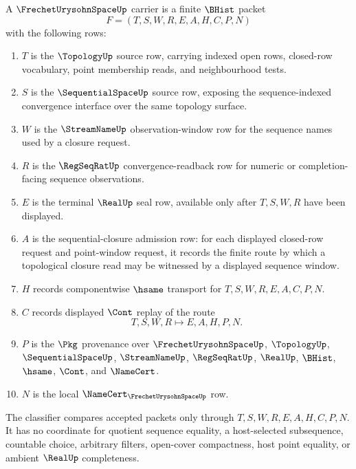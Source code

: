 \begin{definition}\label{def:frechet-urysohn-space-carrier}
A $\FrechetUrysohnSpaceUp$ carrier is a finite $\BHist$ packet
$$
F=(T,S,W,R,E,A,H,C,P,N)
$$
with the following rows:
\begin{enumerate}
\item $T$ is the $\TopologyUp$ source row, carrying indexed open rows, closed-row vocabulary, point membership reads, and neighbourhood tests.
\item $S$ is the $\SequentialSpaceUp$ source row, exposing the sequence-indexed convergence interface over the same topology surface.
\item $W$ is the $\StreamNameUp$ observation-window row for the sequence names used by a closure request.
\item $R$ is the $\RegSeqRatUp$ convergence-readback row for numeric or completion-facing sequence observations.
\item $E$ is the terminal $\RealUp$ seal row, available only after $T,S,W,R$ have been displayed.
\item $A$ is the sequential-closure admission row: for each displayed closed-row request and point-window request, it records the finite route by which a topological closure read may be witnessed by a displayed sequence window.
\item $H$ records componentwise $\hsame$ transport for $T,S,W,R,E,A,C,P,N$.
\item $C$ records displayed $\Cont$ replay of the route
$$
T,S,W,R \longmapsto E,A,H,P,N .
$$
\item $P$ is the $\Pkg$ provenance over $\FrechetUrysohnSpaceUp$, $\TopologyUp$, $\SequentialSpaceUp$, $\StreamNameUp$, $\RegSeqRatUp$, $\RealUp$, $\BHist$, $\hsame$, $\Cont$, and $\NameCert$.
\item $N$ is the local $\NameCert_{\FrechetUrysohnSpaceUp}$ row.
\end{enumerate}
The classifier compares accepted packets only through $T,S,W,R,E,A,H,C,P,N$. It has no coordinate for quotient sequence equality, a host-selected subsequence, countable choice, arbitrary filters, open-cover compactness, host point equality, or ambient $\RealUp$ completeness.
\end{definition}


